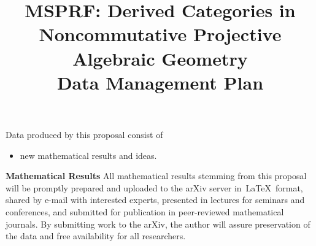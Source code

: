 \documentclass[11pt]{article}
\title{MSPRF: Derived Categories in Noncommutative Projective Algebraic Geometry\\\small{Data Management Plan}}
\date{}
\begin{document}
\maketitle

Data produced by this proposal consist of
\begin{itemize}
\item
  new mathematical results and ideas.
\end{itemize}

\textbf{Mathematical Results}
All mathematical results stemming from this proposal will be promptly prepared and uploaded to the arXiv server in\ \LaTeX\ format, shared by e-mail with interested experts, presented in lectures for seminars and conferences, and submitted for publication in peer-reviewed mathematical journals.
By submitting work to the arXiv, the author will assure preservation of the data and free availability for all researchers.
\end{document}
